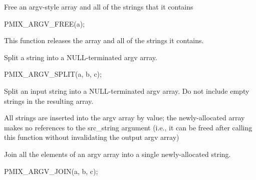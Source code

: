 
\summary

Free an argv-style array and all of the strings that it contains

\cspecificstart
\begin{codepar}
PMIX_ARGV_FREE(a);
\end{codepar}
\cspecificend

\begin{arglist}
\end{arglist}

\descr

This function releases the array and all of the strings it contains.


\summary

Split a string into a NULL-terminated argv array.

\cspecificstart
\begin{codepar}
PMIX_ARGV_SPLIT(a, b, c);
\end{codepar}
\cspecificend

\begin{arglist}
\end{arglist}

\descr

Split an input string into a NULL-terminated argv array. Do not include empty strings in the resulting array.

\adviceuserstart
All strings are inserted into the argv array by value; the newly-allocated array makes no references to the src_string argument (i.e., it can be freed after calling this function without invalidating the output argv array)
\adviceuserend


\summary

Join all the elements of an argv array into a single newly-allocated string.

\cspecificstart
\begin{codepar}
PMIX_ARGV_JOIN(a, b, c);
\end{codepar}
\cspecificend

